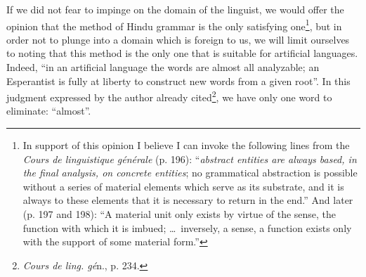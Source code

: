 {    If we did not fear to impinge on the domain of the linguist, we
    would offer the opinion that the method of Hindu grammar is the
    only satisfying one\footnote{In support of this opinion I believe I
      can invoke the following lines from the \emph{Cours de
        linguistique générale} (p. 196): ``\emph{abstract entities
        are always based, in the final analysis, on concrete entities}; no
      grammatical abstraction is possible without a series of material
      elements which serve as its substrate, and it is always to these
      elements that it is necessary to return in the end.'' And later
      (p. 197 and 198): ``A material unit only exists by virtue of the
      sense, the function with which it is imbued; \ldots\ inversely,
      a sense, a function exists only with the support of some
      material form.''}, but in order not to plunge into a domain
    which is foreign to us, we will limit ourselves to noting that
    this method is the only one that is suitable for artificial
    languages. Indeed, ``in an artificial language the words are
    almost all analyzable; an Esperantist is fully at liberty to
    construct new words from a given root''. In this judgment
    expressed by the author already cited\footnote{\emph{Cours de
        ling. gé}n., p. 234.}, we have only one word to eliminate:
    ``almost''. 
    }
    

